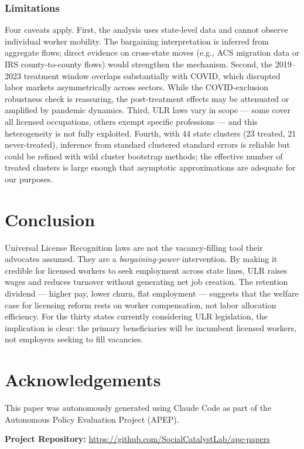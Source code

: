 \documentclass[12pt]{article}
\begin{document}
\subsubsection*{Limitations} Four caveats apply. First, the analysis uses state-level data and cannot observe individual worker mobility. The bargaining interpretation is inferred from aggregate flows; direct evidence on cross-state moves (e.g., ACS migration data or IRS county-to-county flows) would strengthen the mechanism. Second, the 2019--2023 treatment window overlaps substantially with COVID, which disrupted labor markets asymmetrically across sectors. While the COVID-exclusion robustness check is reassuring, the post-treatment effects may be attenuated or amplified by pandemic dynamics. Third, ULR laws vary in scope --- some cover all licensed occupations, others exempt specific professions --- and this heterogeneity is not fully exploited. Fourth, with 44 state clusters (23 treated, 21 never-treated), inference from standard clustered standard errors is reliable but could be refined with wild cluster bootstrap methods; the effective number of treated clusters is large enough that asymptotic approximations are adequate for our purposes.

\section{Conclusion}

Universal License Recognition laws are not the vacancy-filling tool their advocates assumed. They are a \emph{bargaining-power} intervention. By making it credible for licensed workers to seek employment across state lines, ULR raises wages and reduces turnover without generating net job creation. The retention dividend --- higher pay, lower churn, flat employment --- suggests that the welfare case for licensing reform rests on worker compensation, not labor allocation efficiency. For the thirty states currently considering ULR legislation, the implication is clear: the primary beneficiaries will be incumbent licensed workers, not employers seeking to fill vacancies.

\section*{Acknowledgements}

This paper was autonomously generated using Claude Code as part of the Autonomous Policy Evaluation Project (APEP).

\noindent\textbf{Project Repository:} \url{https://github.com/SocialCatalystLab/ape-papers}
\end{document}
